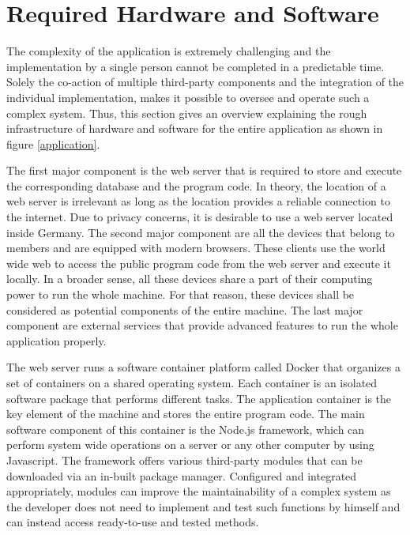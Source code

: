 \documentclass[12pt,numbers=noenddot,parskip,bibliography=totocnumbered,listof=totocnumbered,draft]{scrreprt}
\begin{document}
\section{Required Hardware and Software}
The complexity of the application is extremely challenging and the implementation by a single person cannot be completed in a predictable time. Solely the co-action of multiple third-party components and the integration of the individual implementation, makes it possible to oversee and operate such a complex system. Thus, this section gives an overview explaining the rough infrastructure of hardware and software for the entire application as shown in figure \ref{application}.

The first major component is the web server that is required to store and execute the corresponding database and the program code. In theory, the location of a web server is irrelevant as long as the location provides a reliable connection to the internet. Due to privacy concerns, it is desirable to use a web server located inside Germany. The second major component are all the devices that belong to members and are equipped with modern browsers. These clients use the world wide web to access the public program code from the web server and execute it locally. In a broader sense, all these devices share a part of their computing power to run the whole machine. For that reason, these devices shall be considered as potential components of the entire machine. The last major component are external services that provide advanced features to run the whole application properly.

The web server runs a software container platform called Docker \citep{docker} that organizes a set of containers on a shared operating system. Each container is an isolated software package that performs different tasks. The application container is the key element of the machine and stores the entire program code. The main software component of this container is the Node.js \citep{nodejs} framework, which can perform system wide operations on a server or any other computer by using Javascript. The framework offers various third-party modules that can be downloaded via an in-built package manager. Configured and integrated appropriately, modules can improve the maintainability of a complex system as the developer does not need to implement and test such functions by himself and can instead access ready-to-use and tested methods. 
\end{document}
